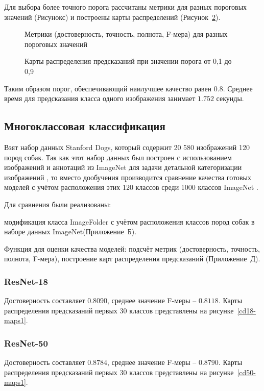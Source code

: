 Для выбора более точного порога рассчитаны метрики для разных пороговых значений (Рисунокс) и построены карты распределений (Рисунок~\ref{cp101-maps}). 

\begin{figure}[H]
	\center{\texttt{[image: cp101-p1]}} 
	\caption{Метрики (достоверность, точность, полнота, F-мера) для разных пороговых значений}
	\label{cp101-p}
\end{figure}

\begin{figure}[H]
	\caption{Карты распределения предсказаний при значении порога от 0,1 до 0,9}
	\label{cp101-maps}
\end{figure}

Таким образом порог, обеспечивающий наилучшее качество равен $0.8$.  Среднее время для предсказания класса одного изображения занимает $1.752$ секунды.


\subsection{Многоклассовая классификация}
Взят набор данных Stanford Dogs, который содержит 20 580 изображений 120 пород собак. Так как этот набор данных был построен с использованием изображений и аннотаций из ImageNet для задачи детальной категоризации изображений \cite{dsdogs}, то вместо дообучения производится сравнение качества готовых моделей с учётом расположения этих 120 классов среди 1000 классов ImageNet \cite{dsdogsin}.

Для сравнения были реализованы: 
\begin{itemize*}
	\item модификация класса ImageFolder с учётом расположения классов пород собак в наборе данных ImageNet(Приложение~Б).
	\item Функция для оценки качества моделей: подсчёт метрик (достоверность, точность, полнота, F-мера), построение карт распределения предсказаний (Приложение~Д).
\end{itemize*}

\subsubsection{ResNet-18}
Достоверность составляет $0.8090$, среднее значение F-меры -- $0.8118$. 
Карты распределения предсказаний первых 30 классов представлены на рисунке~\ref{cd18-maps1}.

\subsubsection{ResNet-50}
Достоверность составляет $0.8784$, среднее значение F-меры -- $0.8790$.
Карты распределения предсказаний первых 30 классов представлены на рисунке~\ref{cd50-maps1}.


